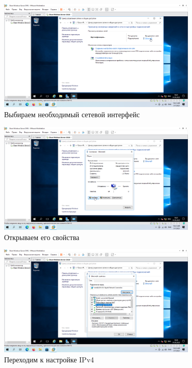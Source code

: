 \documentclass[a4paper]{article}
\begin{document}
  \begin{figure}[H]
    \centering
    \includegraphics[width=0.85\textwidth]{9_0017}
    \caption{Выбираем необходимый сетевой интерфейс}
    \label{img:0017}
  \end{figure}

  \begin{figure}[H]
    \centering
    \includegraphics[width=0.85\textwidth]{9_0018}
    \caption{Открываем его свойства}
    \label{img:0018}
  \end{figure}

  \begin{figure}[H]
    \centering
    \includegraphics[width=0.85\textwidth]{9_0019}
    \caption{Переходим к настройке IPv4}
    \label{img:0019}
  \end{figure}
\end{document}
